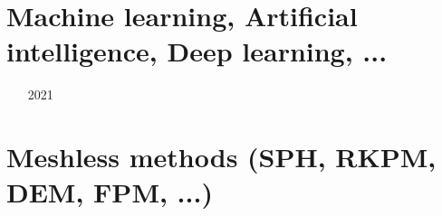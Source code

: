 \section{Machine learning, Artificial intelligence, Deep learning, ...}

\begin{scriptsize}
\begin{itemize}
\item[2021] \textcite{agtk21} 
\end{itemize}
\end{scriptsize}

\section{Meshless methods (SPH, RKPM, DEM, FPM, ...)}

